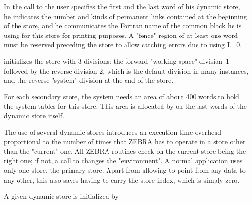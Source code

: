 In the call to  the user specifies the first and the last
word of his dynamic store, he indicates the number and kinds
of permanent links contained at the beginning of the store,
and he communicates the Fortran name of the common block he
is using for this store for printing purposes.
A "fence" region of at least one word must be reserved preceding
the store to allow catching errors due to using L=0.

 initializes the store with 3 divisions:
the forward "working space" division~1
followed by the reverse division 2, which is the default division
in many instances, and the reverse "system" division
at the end of the store.

For each secondary store, the system needs an area of
about 400 words to hold the system tables for this store.
This area is allocated by  on the last words
of the dynamic store itself.

The use of several dynamic stores introduces an execution time
overhead proportional to the number of times that ZEBRA has to
operate in a store other than the "current" one.
All ZEBRA routines check on the current store being the right one;
if not, a call to  changes the "environment".
A normal application uses only one store, the primary store.
Apart from allowing to point from any data to any other,
this also saves having to carry the store index,
which is simply zero.

A given dynamic store is initialized by



